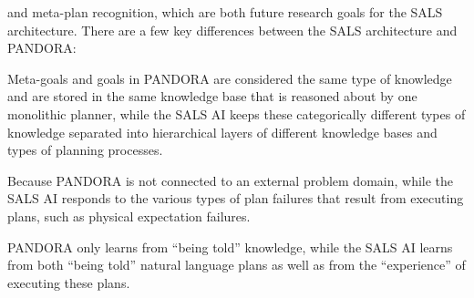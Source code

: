and meta-plan recognition, which are both future research goals for
the SALS architecture.  There are a few key differences between the
SALS architecture and PANDORA:
\begin{packed_enumerate}
\item{Meta-goals and goals in PANDORA are considered the same type of
  knowledge and are stored in the same knowledge base that is reasoned
  about by one monolithic planner, while the SALS AI keeps these
  categorically different types of knowledge separated into
  hierarchical layers of different knowledge bases and types of
  planning processes.}
\item{Because PANDORA is not connected to an external problem domain,
  while the SALS AI responds to the various types of plan failures
  that result from executing plans, such as physical expectation
  failures.}
\item{PANDORA only learns from ``being told'' knowledge, while the
  SALS AI learns from both ``being told'' natural language plans as
  well as from the ``experience'' of executing these plans.}
\end{packed_enumerate}

